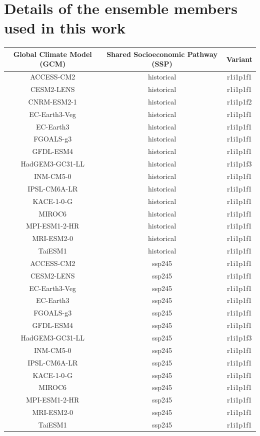 \section{Details of the ensemble members used in this work}
\begin{table}
    \centering
    \begin{tabular}{|c|c|c|}
        \hline
        Global Climate Model (GCM) & Shared Socioeconomic Pathway (SSP) & Variant \\
        \hline
        \hline
        ACCESS-CM2 & historical & r1i1p1f1 \\
        CESM2-LENS & historical & r1i1p1f1 \\
        CNRM-ESM2-1 & historical & r1i1p1f2 \\
        EC-Earth3-Veg & historical & r1i1p1f1 \\
        EC-Earth3 & historical & r1i1p1f1 \\
        FGOALS-g3 & historical & r1i1p1f1 \\
        GFDL-ESM4 & historical & r1i1p1f1 \\
        HadGEM3-GC31-LL & historical & r1i1p1f3 \\
        INM-CM5-0 & historical & r1i1p1f1 \\
        IPSL-CM6A-LR & historical & r1i1p1f1 \\
        KACE-1-0-G & historical & r1i1p1f1 \\
        MIROC6 & historical & r1i1p1f1 \\
        MPI-ESM1-2-HR & historical & r1i1p1f1 \\
        MRI-ESM2-0 & historical & r1i1p1f1 \\
        TaiESM1 & historical & r1i1p1f1 \\
        \hline

        ACCESS-CM2 & ssp245 & r1i1p1f1 \\
        CESM2-LENS & ssp245 & r1i1p1f1 \\
        EC-Earth3-Veg & ssp245 & r1i1p1f1 \\
        EC-Earth3 & ssp245 & r1i1p1f1 \\
        FGOALS-g3 & ssp245 & r1i1p1f1 \\
        GFDL-ESM4 & ssp245 & r1i1p1f1 \\
        HadGEM3-GC31-LL & ssp245 & r1i1p1f3 \\
        INM-CM5-0 & ssp245 & r1i1p1f1 \\
        IPSL-CM6A-LR & ssp245 & r1i1p1f1 \\
        KACE-1-0-G & ssp245 & r1i1p1f1 \\
        MIROC6 & ssp245 & r1i1p1f1 \\
        MPI-ESM1-2-HR & ssp245 & r1i1p1f1 \\
        MRI-ESM2-0 & ssp245 & r1i1p1f1 \\
        TaiESM1 & ssp245 & r1i1p1f1 \\


\end{tabular}
\end{table}
